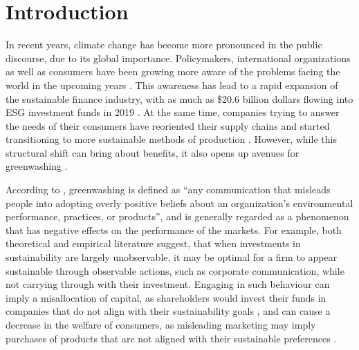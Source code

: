 \documentclass[12pt]{article}
\author{Your Name}
\date{Date of submission: \today}
\begin{document}

\pagebreak
{}




\tableofcontents
\pagebreak
\listoffigures
\listoftables
\pagebreak

\setcounter{page}{1}

\section{Introduction}\label{sect:introduction}

In recent years, climate change has become more pronounced in the public discourse, due to its global importance. Policymakers, international organizations as well as consumers have been growing more aware of the problems facing the world in the upcoming years \parencite{pew2022climate}. This awareness has lead to a rapid expansion of the sustainable finance industry, with as much as \$20.6 billion dollars flowing into ESG investment funds in 2019 \parencite{hale2020sustainable}. At the same time, companies trying to answer the needs of their consumers have reoriented their supply chains and started transitioning to more sustainable methods of production \parencite{pwc2023supplychain, pwc2023sustainability}. However, while this structural shift can bring about benefits, it also opens up avenues for greenwashing \parencite{villenaMoreSustainableSupply2020}. 

According to \textcite{lyonMeansEndGreenwash2015}, greenwashing is defined as ``any communication that misleads people into adopting overly positive beliefs about an organization's  environmental performance, practices, or products'', and is generally regarded as a phenomenon that has negative effects on the performance of the markets. For example, both theoretical \parencite{wuBadGreenwashingGood2020, cartellierCanInvestorsCurb2023} and empirical \parencite{barrageAdvertisingEnvironmentalStewardship2020, marquisScrutinyNormsSelective2016, kimGreenwashVsBrownwash2015} literature suggest, that when investments in sustainability are largely unobservable, it may be optimal for a firm to appear sustainable through observable actions, such as corporate communication, while not carrying through with their investment. Engaging in such behaviour can imply a misallocation of capital, as shareholders would invest their funds in companies that do not align with their sustainability goals \parencite{kimGreenwashVsBrownwash2015}, and can cause a decrease in the welfare of consumers, as misleading marketing may imply purchases of products that are not aligned with their sustainable preferences \parencite{barrageAdvertisingEnvironmentalStewardship2020}.
\end{document}
